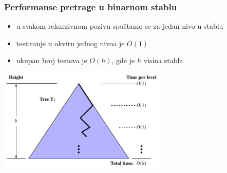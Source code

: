 \documentclass[compress,aspectratio=169]{beamer}
\begin{document}
\begin{frame}[fragile]
  \frametitle{Performanse pretrage u binarnom stablu}
  \begin{itemize}
    \item u svakom rekurzivnom pozivu spuštamo se za jedan nivo u stablu
    \item testiranje u okviru jednog nivoa je $O(1)$
    \item ukupan broj testova je $O(h)$, gde je $h$ visina stabla
  \end{itemize}
  \begin{center}
    \includegraphics[width=8cm]{asp-11-pic04.pdf}
  \end{center}
\end{frame}
\end{document}
